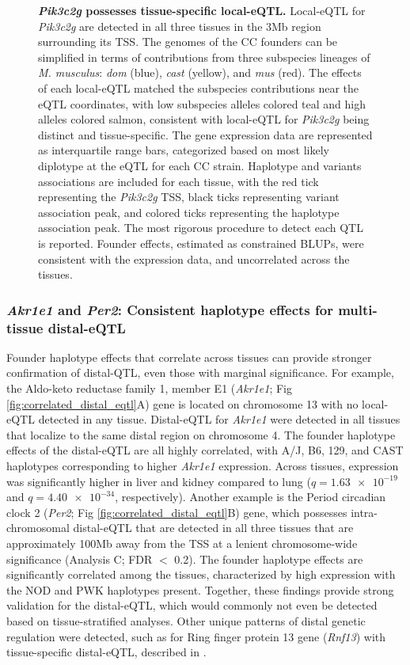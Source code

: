 \documentclass[10pt,letterpaper]{article}
\begin{document}
\begin{figure}[h!]
\caption{\textbf{\textit{Pik3c2g} possesses tissue-specific local-eQTL.} Local-eQTL for \textit{Pik3c2g} are detected in all three tissues in the 3Mb region surrounding its TSS. The genomes of the CC founders can be simplified in terms of contributions from three subspecies lineages of \textit{M. musculus}: \textit{dom} (blue), \textit{cast} (yellow), and \textit{mus} (red). The effects of each local-eQTL matched the subspecies contributions near the eQTL coordinates, with low subspecies alleles colored teal and high alleles colored salmon, consistent with local-eQTL for \textit{Pik3c2g} being distinct and tissue-specific. The gene expression data are represented as interquartile range bars, categorized based on most likely diplotype at the eQTL for each CC strain. Haplotype and variants associations are included for each tissue, with the red tick representing the \textit{Pik3c2g} TSS, black ticks representing variant association peak, and colored ticks representing the haplotype association peak. The most rigorous procedure to detect each QTL is reported. Founder effects, estimated as constrained BLUPs, were consistent with the expression data, and uncorrelated across the tissues.
\label{fig:pik3c2g}}
\end{figure}

\subsubsection*{\textit{Akr1e1} and \textit{Per2}: Consistent haplotype effects for multi-tissue distal-eQTL}
Founder haplotype effects that correlate across tissues can provide stronger confirmation of distal-QTL, even those with marginal significance. 
For example, the Aldo-keto reductase family 1, member E1 (\textit{Akr1e1}; Fig \ref{fig:correlated_distal_eqtl}A) gene is located on chromosome 13 with no local-eQTL detected in any tissue. Distal-eQTL for \textit{Akr1e1} were detected in all tissues that localize to the same distal region on chromosome 4. The founder haplotype effects of the distal-eQTL are all highly correlated, with A/J, B6, 129, and CAST haplotypes corresponding to higher \textit{Akr1e1} expression. Across tissues, expression was significantly higher in liver and kidney compared to lung ($q = \num{1.63e-19}$ and $q = \num{4.40e-34}$, respectively).
Another example is the Period circadian clock 2 (\textit{Per2}; Fig \ref{fig:correlated_distal_eqtl}B) gene, which possesses intra-chromosomal distal-eQTL that are detected in all three tissues that are approximately 100Mb away from the TSS at a lenient chromosome-wide significance (Analysis C; FDR $<$ 0.2). The founder haplotype effects are significantly correlated among the tissues, characterized by high expression with the NOD and PWK haplotypes present. Together, these findings provide strong validation for the distal-eQTL, which would commonly not even be detected based on tissue-stratified analyses.
Other unique patterns of distal genetic regulation were detected, such as for Ring finger protein 13 gene (\textit{Rnf13}) with tissue-specific distal-eQTL, described in .
\end{document}
